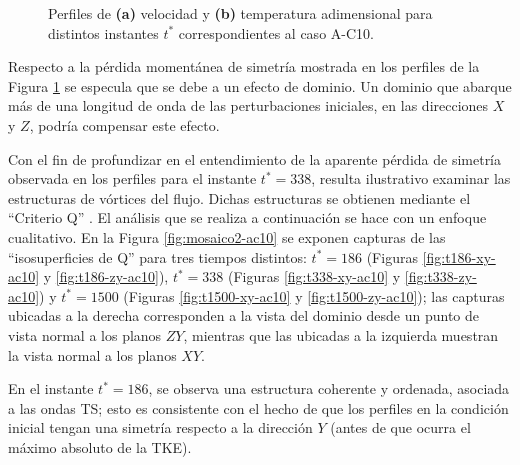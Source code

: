 \begin{figure}[H]
  \centering  
  
  \caption{Perfiles de \textbf{(a)} velocidad y \textbf{(b)} temperatura adimensional para distintos instantes $t^*$ correspondientes al caso A-C10.}
  \label{fig:mosaico-ac10}
\end{figure} 

Respecto a la pérdida momentánea de simetría mostrada en los perfiles de la Figura \ref{fig:mosaico-ac10}  se especula que se debe a un efecto de dominio. Un dominio que abarque más de una longitud de onda de las perturbaciones iniciales, en las direcciones $X$ y $Z$, podría compensar este efecto.

Con el fin de profundizar en el entendimiento de la aparente pérdida de simetría observada en los perfiles para el instante $t^* = 338$, resulta ilustrativo examinar las estructuras de vórtices del flujo. Dichas estructuras se obtienen mediante el ``Criterio Q'' \cite{hunt1988eddies}. El análisis que se realiza a continuación se hace con un enfoque cualitativo. En la Figura \ref{fig:mosaico2-ac10} se exponen capturas de las ``isosuperficies de Q'' para tres tiempos distintos: $t^* = 186$ (Figuras \ref{fig:t186-xy-ac10} y  \ref{fig:t186-zy-ac10}),  $t^* = 338$  (Figuras \ref{fig:t338-xy-ac10} y  \ref{fig:t338-zy-ac10}) y  $t^* = 1500$  (Figuras \ref{fig:t1500-xy-ac10} y  \ref{fig:t1500-zy-ac10}); las capturas ubicadas a la derecha corresponden a la vista del dominio desde un punto de vista normal a los planos $ZY$, mientras que las ubicadas a la izquierda muestran la vista normal a los planos $XY$.

En el instante $t^* = 186$, se observa una estructura coherente y ordenada, asociada a las ondas TS; esto es consistente con el hecho de que los perfiles en la condición inicial tengan una simetría respecto a la dirección $Y$ (antes de que ocurra el máximo absoluto de la TKE). 



